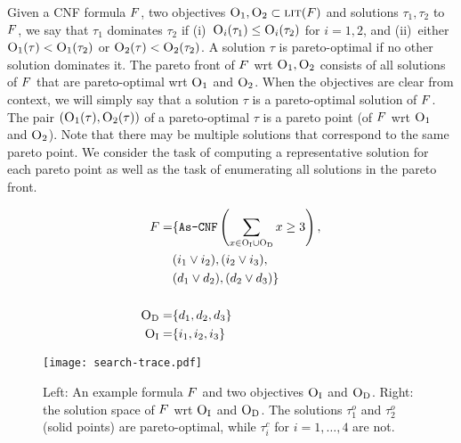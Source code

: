 
Given a CNF formula $F$, two objectives $\textsc{O}_1, \textsc{O}_2 \subset \textsc{lit}(F)$ and solutions $\tau_1, \tau_2$ to $F$, we say that $\tau_1$
dominates  $\tau_2$ if (i)~$\textsc{O}_i(\tau_1) \leq \textsc{O}_i(\tau_2)$ for $i=1,2$, and (ii)~either
$\textsc{O}_1(\tau) < \textsc{O}_1(\tau_2)$  or $\textsc{O}_2(\tau) < \textsc{O}_2(\tau_2)$.
A solution $\tau$ is pareto-optimal if no other solution dominates it. The pareto front of $F$ wrt $\textsc{O}_1, \textsc{O}_2$ consists of all solutions of
 $F$ that are pareto-optimal wrt $\textsc{O}_1$ and $\textsc{O}_2$. 
When the objectives are clear from context, we will simply say that a solution $\tau$ is a pareto-optimal solution of $F$. 
The pair $(\textsc{O}_1(\tau),\textsc{O}_2(\tau))$ of a pareto-optimal $\tau$ is a pareto point (of $F$ wrt $\textsc{O}_1$ and $\textsc{O}_2$).
Note that there may be multiple solutions that correspond to the same pareto point.
We consider the task of computing a representative solution for each pareto point as well as the task of enumerating all solutions in the pareto front.

\begin{figure}
  \begin{minipage}{0.36\textwidth}
  \footnotesize
  \begin{align*}
  F = &\{ \texttt{As-CNF}\left(\sum_ {x \in \textsc{O}_{\text{I}} \cup \textsc{O}_{\text{D}}} x \geq 3 \right), \\
  			&(i_1 \lor i_2),  (i_2 \lor i_3), \\
		 &(d_1 \lor d_2), (d_2 \lor d_3) \} \\ \\
  \textsc{O}_{\text{D}} =&\{ d_1,d_2, d_3\}   \\ 
  \textsc{O}_{\text{I}} =&\{ i_1,i_2, i_3\}  
  \end{align*}
  \end{minipage}
  \;
  \begin{minipage}{0.6\textwidth}
    \texttt{[image: search-trace.pdf]}
  \end{minipage}
  \caption{Left: An example formula $F$ and two objectives $\textsc{O}_{\text{I}}$ and $\textsc{O}_{\text{D}}$. Right: the solution space of 
  $F$ wrt $\textsc{O}_{\text{I}}$ and $\textsc{O}_{\text{D}}$. The solutions $\tau^o_1$ and $\tau^o_2$ (solid points) are pareto-optimal, 
  while $\tau^c_i$ for $i=1,\ldots,4$ are  not.\label{fig:search-trace}}
\end{figure}

